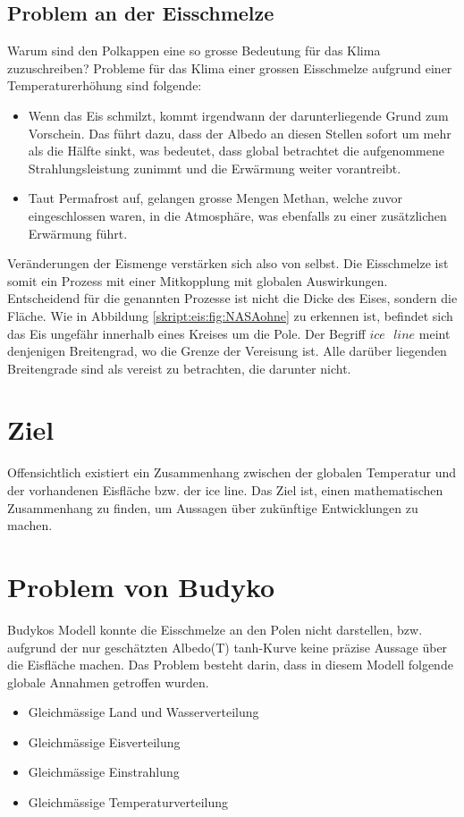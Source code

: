 \begin{refsection}
\subsection{Problem an der Eisschmelze}
Warum sind den Polkappen eine so grosse Bedeutung für das Klima zuzuschreiben? Probleme für das Klima einer grossen Eisschmelze aufgrund einer Temperaturerhöhung sind folgende: 
\begin{itemize}
	\item Wenn das Eis schmilzt, kommt irgendwann der darunterliegende Grund zum Vorschein. Das führt dazu, dass der Albedo an diesen Stellen sofort um mehr als die Hälfte sinkt, was bedeutet, dass global betrachtet die aufgenommene Strahlungsleistung zunimmt und die Erwärmung weiter vorantreibt.
	\item Taut Permafrost auf, gelangen grosse Mengen Methan, welche zuvor eingeschlossen waren, in die Atmosphäre, was ebenfalls zu einer zusätzlichen Erwärmung führt.
\end{itemize}
Veränderungen der Eismenge verstärken sich also von selbst.
Die Eisschmelze ist somit ein Prozess mit einer Mitkopplung mit globalen Auswirkungen.
Entscheidend für die genannten Prozesse ist nicht die Dicke des Eises, sondern die Fläche. Wie in Abbildung \ref{skript:eis:fig:NASAohne} zu erkennen ist, befindet sich das Eis ungefähr innerhalb eines Kreises um die Pole. Der Begriff $ice\text{ }line$ meint denjenigen Breitengrad, wo die Grenze der Vereisung ist.
%
Alle darüber liegenden Breitengrade sind als vereist zu betrachten, die darunter nicht.
\section{Ziel}
Offensichtlich existiert ein Zusammenhang zwischen der globalen Temperatur und der vorhandenen Eisfläche bzw. der ice line. Das Ziel ist, einen mathematischen Zusammenhang zu finden, um Aussagen über zukünftige Entwicklungen zu machen.
\section{Problem von Budyko}
Budykos Modell konnte die Eisschmelze an den Polen nicht darstellen, bzw. aufgrund der nur geschätzten Albedo(T) tanh-Kurve keine präzise Aussage über die Eisfläche machen. Das Problem besteht darin, dass in diesem Modell folgende globale Annahmen getroffen wurden.
\begin{itemize}
	\item Gleichmässige Land und Wasserverteilung
	\item Gleichmässige Eisverteilung
	\item Gleichmässige Einstrahlung
	\item Gleichmässige Temperaturverteilung
\end{itemize}

\end{refsection}
